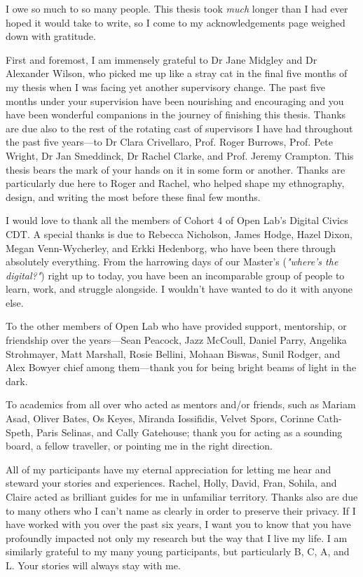
\begin{acknowledgements}
I owe so much to so many people. This thesis took \textit{much} longer than I had ever hoped it would take to write, so I come to my acknowledgements page weighed down with gratitude.

First and foremost, I am immensely grateful to Dr Jane Midgley and Dr Alexander Wilson, who picked me up like a stray cat in the final five months of my thesis when I was facing yet another supervisory change. The past five months under your supervision have been nourishing and encouraging and you have been wonderful companions in the journey of finishing this thesis. Thanks are due also to the rest of the rotating cast of supervisors I have had throughout the past five years—to Dr Clara Crivellaro, Prof. Roger Burrows, Prof. Pete Wright, Dr Jan Smeddinck, Dr Rachel Clarke, and Prof. Jeremy Crampton. This thesis bears the mark of your hands on it in some form or another. Thanks are particularly due here to Roger and Rachel, who helped shape my ethnography, design, and writing the most before these final few months.

I would love to thank all the members of Cohort 4 of Open Lab's Digital Civics CDT. A special thanks is due to Rebecca Nicholson, James Hodge, Hazel Dixon, Megan Venn-Wycherley, and Erkki Hedenborg, who have been there through absolutely everything. From the harrowing days of our Master's (\textit{"where's the digital?"}) right up to today, you have been an incomparable group of people to learn, work, and struggle alongside. I wouldn't have wanted to do it with anyone else.

To the other members of Open Lab who have provided support, mentorship, or friendship over the years—Sean Peacock, Jazz McCoull, Daniel Parry, Angelika Strohmayer, Matt Marshall, Rosie Bellini, Mohaan Biswas, Sunil Rodger, and Alex Bowyer chief among them—thank you for being bright beams of light in the dark.

To academics from all over who acted as mentors and/or friends, such as Mariam Asad, Oliver Bates, Os Keyes, Miranda Iossifidis, Velvet Spors, Corinne Cath-Speth, Paris Selinas, and Cally Gatehouse; thank you for acting as a sounding board, a fellow traveller, or pointing me in the right direction.

All of my participants have my eternal appreciation for letting me hear and steward your stories and experiences. Rachel, Holly, David, Fran, Sohila, and Claire acted as brilliant guides for me in unfamiliar territory. Thanks also are due to many others who I can't name as clearly in order to preserve their privacy. If I have worked with you over the past six years, I want you to know that you have profoundly impacted not only my research but the way that I live my life. I am similarly grateful to my many young participants, but particularly B, C, A, and L. Your stories will always stay with me.


\end{acknowledgements}
